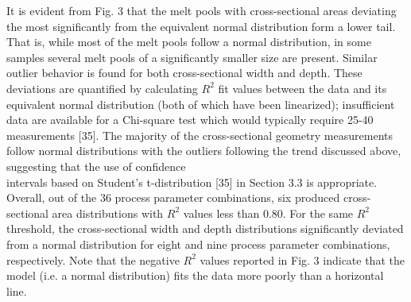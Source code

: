 \documentclass[10pt]{article}
\begin{document}
It is evident from Fig. 3 that the melt pools with cross-sectional areas deviating the most significantly from the equivalent normal distribution form a lower tail. That is, while most of the melt pools follow a normal distribution, in some samples several melt pools of a significantly smaller size are present. Similar outlier behavior is found for both cross-sectional width and depth. These deviations are quantified by calculating $R^{2}$ fit values between the data and its equivalent normal distribution (both of which have been linearized); insufficient data are available for a Chi-square test which would typically require 25-40 measurements [35]. The majority of the cross-sectional geometry measurements follow normal distributions with the outliers following the trend discussed above, suggesting that the use of confidence\\
intervals based on Student's t-distribution [35] in Section 3.3 is appropriate. Overall, out of the 36 process parameter combinations, six produced cross-sectional area distributions with $R^{2}$ values less than 0.80. For the same $R^{2}$ threshold, the cross-sectional width and depth distributions significantly deviated from a normal distribution for eight and nine process parameter combinations, respectively. Note that the negative $R^{2}$ values reported in Fig. 3 indicate that the model (i.e. a normal distribution) fits the data more poorly than a horizontal line.
\end{document}

